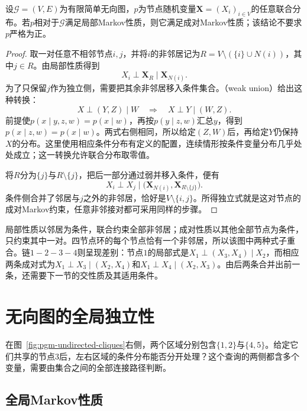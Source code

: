 \begin{theorem}[局部Markov性质蕴含成对Markov性质]
  \label{thm:pgm-undirected-local-to-pairwise}
  设$\mathcal{G}=(V,E)$为有限简单无向图，$p$为节点随机变量$\bm{X}=(X_i)_{i\in V}$的任意联合分布。若$p$相对于$\mathcal{G}$满足局部Markov性质，则它满足成对Markov性质；该结论不要求$p$严格为正。
\end{theorem}

\begin{proof}
取一对任意不相邻节点$i,j$，并将$i$的非邻居记为$R=V\setminus(\{i\}\cup N(i))$，其中$j\in R$。由局部性质得到
\[
  X_i\perp\bm{X}_R\mid\bm{X}_{N(i)}.
\]
为了只保留$j$作为独立侧，需要把其余非邻居移入条件集合。（weak union）给出这种转换：
\[
  X\perp(Y,Z)\mid W
  \quad\Longrightarrow\quad
  X\perp Y\mid(W,Z).
\]
前提使$p(x\mid y,z,w)=p(x\mid w)$，再按$p(y\mid z,w)$汇总$y$，得到$p(x\mid z,w)=p(x\mid w)$。两式右侧相同，所以给定$(Z,W)$后，再给定$Y$仍保持$X$的分布。这里使用相应条件分布有定义的配置，连续情形按条件变量分布几乎处处成立；这一转换允许联合分布取零值。

将$R$分为$\{j\}$与$R\setminus\{j\}$，把后一部分通过弱并移入条件，便有
\[
  X_i\perp X_j
  \mid\bigl(\bm{X}_{N(i)},\bm{X}_{R\setminus\{j\}}\bigr).
\]
条件侧合并了邻居与$j$之外的非邻居，恰好是$V\setminus\{i,j\}$。所得独立式就是这对节点的成对Markov约束，任意非邻接对都可采用同样的步骤。
\end{proof}

局部性质以邻居为条件，联合约束全部非邻居；成对性质以其他全部节点为条件，只约束其中一对。四节点环的每个节点恰有一个非邻居，所以该图中两种式子重合。链$1-2-3-4$则呈现差别：节点$1$的局部式是$X_1\perp(X_3,X_4)\mid X_2$，而相应两条成对式为$X_1\perp X_3\mid(X_2,X_4)$和$X_1\perp X_4\mid(X_2,X_3)$。由后两条合并出前一条，还需要下一节的交性质及其适用条件。

\section{无向图的全局独立性}
\label{sec:pgm-undirected-global-independence}

在图~\ref{fig:pgm-undirected-cliques}右侧，两个区域分别包含$\{1,2\}$与$\{4,5\}$。给定它们共享的节点$3$后，左右区域的条件分布能否分开处理？这个查询的两侧都含多个变量，需要由集合之间的全部连接路径判断。

\subsection{全局Markov性质}
\label{sec:pgm-undirected-global}

